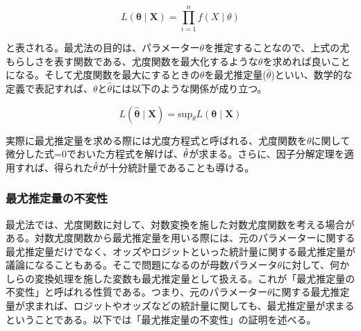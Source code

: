 \documentclass[a4paper,uplatex]{jsarticle}
\begin{document}
\begin{equation}
  L(\bm{\theta} \mid \bm{X}) = \prod_{i=1}^n f(X \mid \theta)
\end{equation}

と表される。最尤法の目的は、パラメーター$\theta$を推定することなので、上式の尤もらしさを表す関数である、尤度関数を最大化するような$\theta$を求めれば良いことになる。そして尤度関数を最大にするときの$\theta$を最尤推定量($\hat{\theta}$)といい、数学的な定義で表記すれば、$\theta$と$\hat{\theta}$には以下のような関係が成り立つ。

\begin{equation}
  L(\bm{\hat{\theta}} \mid \bm{X}) = \mathrm{sup}_\theta L(\bm{\theta} \mid \bm{X})
\end{equation}



実際に最尤推定量を求める際には尤度方程式と呼ばれる、尤度関数を$\theta$に関して微分した式=0でおいた方程式を解けば、$\hat{\bf{\theta}}$が求まる。さらに、因子分解定理を適用すれば、得られた$\hat{\bf{\theta}}$が十分統計量であることも導ける。

\subsubsection*{最尤推定量の不変性}
最尤法では、尤度関数に対して、対数変換を施した対数尤度関数を考える場合がある。対数尤度関数から最尤推定量を用いる際には、元のパラメーターに関する最尤推定量だけでなく、オッズやロジットといった統計量に関する最尤推定量が議論になることもある。そこで問題になるのが母数パラメータ$\theta$に対して、何かしらの変換処理を施した変数も最尤推定量として扱える。これが「最尤推定量の不変性」と呼ばれる性質である。つまり、元のパラメーター$\theta$に関する最尤推定量が求まれば、ロジットやオッズなどの統計量に関しても、最尤推定量が求まるということである。以下では「最尤推定量の不変性」の証明を述べる。
\end{document}
